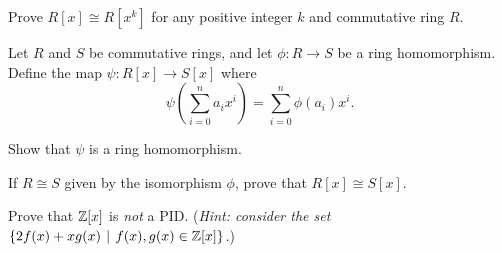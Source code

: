 \begin{problem}
    Prove $R[x] \cong R[x^k]$ for any positive integer $k$ and commutative ring $R$.
\end{problem}

\begin{problem}
    Let $R$ and $S$ be commutative rings, and let $\phi: R \to S$ be a ring homomorphism. Define the map $\psi: R[x] \to S[x]$ where
    \[
        \psi\left(\sum_{i=0}^na_ix^i\right) = \sum_{i=0}^n\phi(a_i)x^i.
    \]
    \begin{partquestions}{\roman*}
        \item Show that $\psi$ is a ring homomorphism.
        \item If $R \cong S$ given by the isomorphism $\phi$, prove that $R[x] \cong S[x]$.
    \end{partquestions}
\end{problem}

\begin{problem}
    Prove that $\mathbb{Z}[x]$ is \textit{not} a PID.\newline
    (\textit{Hint: consider the set $\{2f(x) + xg(x) \vert f(x),g(x) \in \Z[x]\}$.})
\end{problem}
